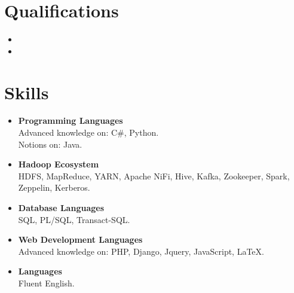 \documentclass[11pt,a4paper,roman]{moderncv}        %
\begin{document}
\section{Qualifications}

\vspace{3pt}

\begin{itemize}
\item{}
\item{}
\end{itemize}

\section{Skills}
\begin{itemize}
\item \textbf{Programming Languages} \\Advanced knowledge on: C\#, Python. \\Notions on: Java.
\vspace{3pt}
\item \textbf{Hadoop Ecosystem}\\HDFS, MapReduce, YARN, Apache NiFi, Hive, Kafka, Zookeeper, Spark, Zeppelin, Kerberos.
\vspace{3pt}
\item \textbf{Database Languages} \\SQL, PL/SQL, Transact-SQL.
\vspace{3pt}
\item \textbf{Web Development Languages} \\Advanced knowledge on: PHP, Django, Jquery, JavaScript, \LaTeX.
\vspace{3pt}
\item \textbf{Languages} \\Fluent English.
\end{itemize}
\nocite{*}
\end{document}
